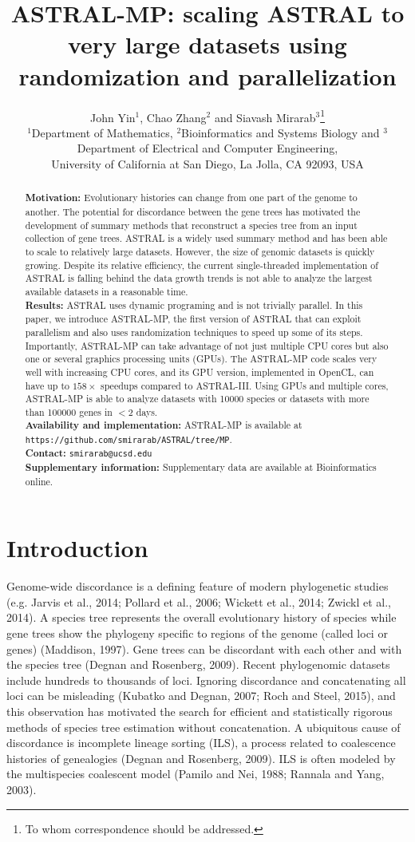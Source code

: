 \documentclass[12pt]{article}
\title{ASTRAL-MP: scaling ASTRAL to very large datasets using randomization and parallelization}
\author{John Yin$^1$, Chao Zhang$^2$ and Siavash Mirarab$^3$\thanks{To whom correspondence should be addressed.}\\
$^1$Department of Mathematics, $^2$Bioinformatics and Systems Biology and $^3$Department of Electrical and Computer Engineering,\\
University of California at San Diego, La Jolla, CA 92093, USA}
\date{}
\begin{document}
\maketitle

\begin{abstract}
\textbf{Motivation:} Evolutionary histories can change from one part of the genome to another. The potential for discordance between the gene trees has motivated the development of summary methods that reconstruct a species tree from an input collection of gene trees. ASTRAL is a widely used summary method and has been able to scale to relatively large datasets. However, the size of genomic datasets is quickly growing. Despite its relative efficiency, the current single-threaded implementation of ASTRAL is falling behind the data growth trends is not able to analyze the largest available datasets in a reasonable time.\\
\textbf{Results:} ASTRAL uses dynamic programing and is not trivially parallel. In this paper, we introduce ASTRAL-MP, the first version of ASTRAL that can exploit parallelism and also uses randomization techniques to speed up some of its steps. Importantly, ASTRAL-MP can take advantage of not just multiple CPU cores but also one or several graphics processing units (GPUs). The ASTRAL-MP code scales very well with increasing CPU cores, and its GPU version, implemented in OpenCL, can have up to $158\times$ speedups compared to ASTRAL-III. Using GPUs and multiple cores, ASTRAL-MP is able to analyze datasets with 10000 species or datasets with more than 100000 genes in $<2$ days.\\
\textbf{Availability and implementation:} ASTRAL-MP is available at \texttt{https://github.com/smirarab/ASTRAL/tree/MP}.\\
\textbf{Contact:} \texttt{smirarab@ucsd.edu}\\
\textbf{Supplementary information:} Supplementary data are available at Bioinformatics online.
\end{abstract}

\section{Introduction}
Genome-wide discordance is a defining feature of modern phylogenetic studies (e.g. Jarvis et al., 2014; Pollard et al., 2006; Wickett et al., 2014; Zwickl et al., 2014). A species tree represents the overall evolutionary history of species while gene trees show the phylogeny specific to regions of the genome (called loci or genes) (Maddison, 1997). Gene trees can be discordant with each other and with the species tree (Degnan and Rosenberg, 2009). Recent phylogenomic datasets include hundreds to thousands of loci. Ignoring discordance and concatenating all loci can be misleading (Kubatko and Degnan, 2007; Roch and Steel, 2015), and this observation has motivated the search for efficient and statistically rigorous methods of species tree estimation without concatenation. A ubiquitous cause of discordance is incomplete lineage sorting (ILS), a process related to coalescence histories of genealogies (Degnan and Rosenberg, 2009). ILS is often modeled by the multispecies coalescent model (Pamilo and Nei, 1988; Rannala and Yang, 2003).
\end{document}
